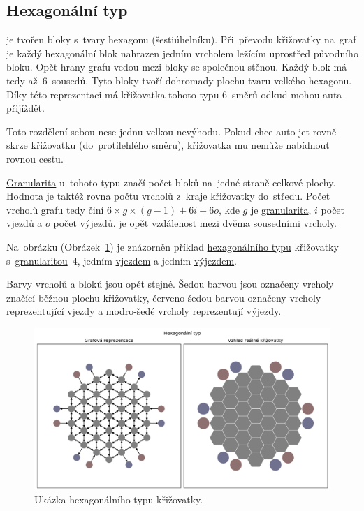 \subsection{Hexagonální typ}\label{subsec:hexagonalni_typ}

 je tvořen bloky s~tvary hexagonu (šestiúhelníku).
Při~převodu křižovatky na~graf je každý hexagonální blok nahrazen jedním vrcholem ležícím uprostřed původního bloku.
Opět hrany grafu vedou mezi bloky se společnou stěnou.
Každý blok má tedy až~$6$~sousedů.
Tyto bloky tvoří dohromady plochu tvaru velkého hexagonu.
Díky této reprezentaci má křižovatka tohoto typu $6$~směrů odkud mohou auta přijíždět.

Toto rozdělení sebou nese jednu velkou nevýhodu.
Pokud chce auto jet rovně skrze křižovatku (do~protilehlého směru), křižovatka mu nemůže nabídnout rovnou cestu.

\hyperref[par:granularita]{Granularita} u~tohoto typu značí počet bloků na~jedné straně celkové plochy.
Hodnota je taktéž rovna počtu vrcholů z~kraje křižovatky do~středu.
Počet vrcholů grafu tedy činí $6 \times g \times (g-1) + 6i + 6o$,
kde $g$ je \hyperref[par:granularita]{granularita},
$i$ počet \hyperref[par:vjezdy]{vjezdů} a $o$ počet \hyperref[par:vyjezdy]{výjezdů}.
 je opět vzdálenost mezi dvěma sousedními vrcholy.

Na~obrázku (Obrázek~\ref{fig:hexagonal_type_graph}) je znázorněn příklad
\hyperref[subsec:hexagonalni_typ]{hexagonálního typu} křižovatky s~\hyperref[par:granularita]{granularitou}~$4$,
jedním \hyperref[par:vjezdy]{vjezdem} a jedním \hyperref[par:vyjezdy]{výjezdem}.

Barvy vrcholů a bloků jsou opět stejné.
Šedou barvou jsou označeny vrcholy značící běžnou plochu křižovatky,
červeno-šedou barvou označeny vrcholy reprezentující \hyperref[par:vjezdy]{vjezdy} a
modro-šedé vrcholy reprezentují \hyperref[par:vyjezdy]{výjezdy}.

\begin{figure}[h]
	\centering
	\includegraphics[width=\textwidth]{../img/Hexagonal_grid}
	\caption{Ukázka hexagonálního typu křižovatky.}
	\label{fig:hexagonal_type_graph}
\end{figure}
